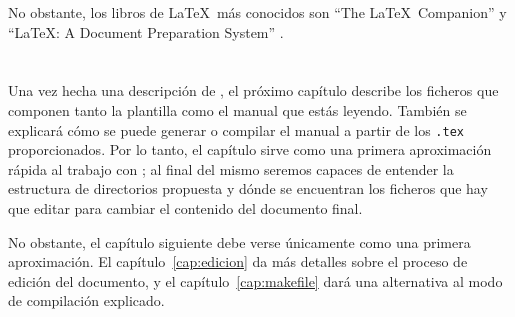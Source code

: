 No obstante, los libros de \LaTeX\ más conocidos son ``The \LaTeX\
Companion'' \citep{latexCompanion} y ``\LaTeX: A Document Preparation
System'' \citep{LaTeXLamport}.

\section*{\ProximoCapitulo}
\TocProximoCapitulo

Una vez hecha una descripción de \texis, el próximo capítulo
describe los ficheros que componen tanto la plantilla como el manual
que estás leyendo. También se explicará cómo se puede generar o
compilar el manual a partir de los \texttt{.tex} proporcionados. Por
lo tanto, el capítulo sirve como una primera aproximación rápida al
trabajo con \texis; al final del mismo seremos capaces de entender
la estructura de directorios propuesta y dónde se encuentran los
ficheros que hay que editar para cambiar el contenido del documento
final.

No obstante, el capítulo siguiente debe verse únicamente como una
primera aproximación. El capítulo~\ref{cap:edicion} da más detalles
sobre el proceso de edición del documento, y el
capítulo~\ref{cap:makefile} dará una alternativa al modo de
compilación explicado.

